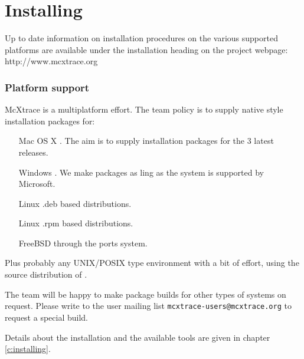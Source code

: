 \chapter{Installing \MCX}
\label{c:install}
Up to date information on installation procedures on the various supported
platforms are available under the installation heading on the \MCX project
webpage: http://www.mcxtrace.org

\subsection{Platform support}
McXtrace is a multiplatform effort. The team policy is to supply native style installation packages
for:
\begin{itemize}
  \item[Mac OS X]. The aim is to supply installation packages for the 3 latest releases.
  \item[Windows]. We make packages as ling as the system is supported by Microsoft.
  \item[Linux] .deb based distributions.
  \item[Linux] .rpm based distributions.
  \item[FreeBSD] through the ports system.
\end{itemize}
Plus probably any UNIX/POSIX type environment with a bit of effort, using the source distribution of \MCX.

The team will be happy to make package builds for other types of systems on
request. Please write to the user mailing list
\texttt{mcxtrace-users@mcxtrace.org} to request a special build.

Details about the installation and the available tools are given in chapter \ref{c:installing}.

